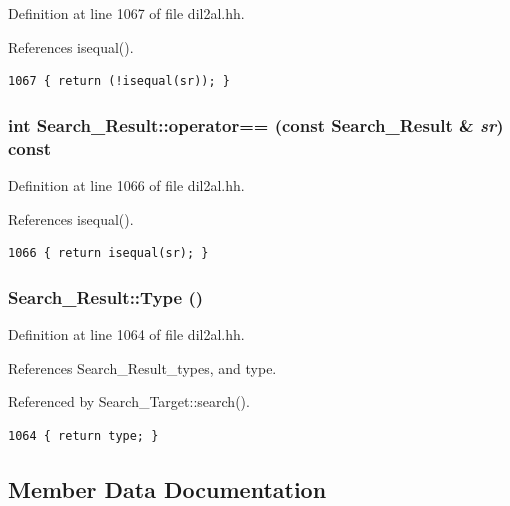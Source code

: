 Definition at line 1067 of file dil2al.hh.

References isequal().



\footnotesize\begin{verbatim}1067 { return (!isequal(sr)); }
\end{verbatim}\normalsize 
{}
\subsubsection{\setlength{\rightskip}{0pt plus 5cm}int Search\_\-Result::operator== (const Search\_\-Result \& {\em sr}) const\hspace{0.3cm}{\tt  [inline]}}\label{classSearch__Result_a3}




Definition at line 1066 of file dil2al.hh.

References isequal().



\footnotesize\begin{verbatim}1066 { return isequal(sr); }
\end{verbatim}\normalsize 
{}
\subsubsection{ Search\_\-Result::Type ()\hspace{0.3cm}{\tt  [inline]}}\label{classSearch__Result_a1}




Definition at line 1064 of file dil2al.hh.

References Search\_\-Result\_\-types, and type.

Referenced by Search\_\-Target::search().



\footnotesize\begin{verbatim}1064 { return type; }
\end{verbatim}\normalsize 


\subsection{Member Data Documentation}
